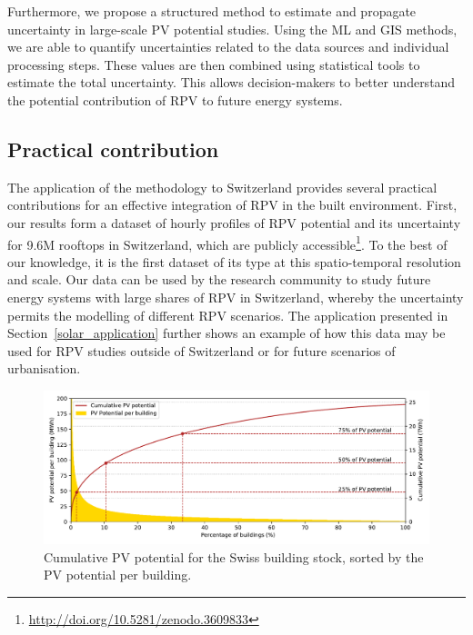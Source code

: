 
Furthermore, we propose a structured method to estimate and propagate uncertainty in large-scale PV potential studies. Using the ML and GIS methods, we are able to quantify uncertainties related to the data sources and individual processing steps. These values are then combined using statistical tools to estimate the total uncertainty.
This allows decision-makers to better understand the potential contribution of RPV to future energy systems. 


\subsection{Practical contribution}

The application of the methodology to Switzerland provides several practical contributions for an effective integration of RPV in the built environment. 
First, our results form a dataset of hourly profiles of RPV potential and its uncertainty for 9.6M rooftops in Switzerland, which are publicly accessible\footnote{\url{http://doi.org/10.5281/zenodo.3609833}}. 
To the best of our knowledge, it is the first dataset of its type at this spatio-temporal resolution and scale. 
Our data can be used by the research community to study future energy systems with large shares of RPV in Switzerland, whereby the uncertainty permits the modelling of different RPV scenarios. 
The application presented in Section~\ref{solar_application} further shows an example of how this data may be used for RPV studies outside of Switzerland or for future scenarios of urbanisation.

\begin{figure}[tb]
\centering
\includegraphics[width=\linewidth]{images/Figs/Cumulative_PV_potential.pdf}
\caption{Cumulative PV potential for the Swiss building stock, sorted by the PV potential per building.}
\label{fig:PV_cumulative}
\end{figure}

